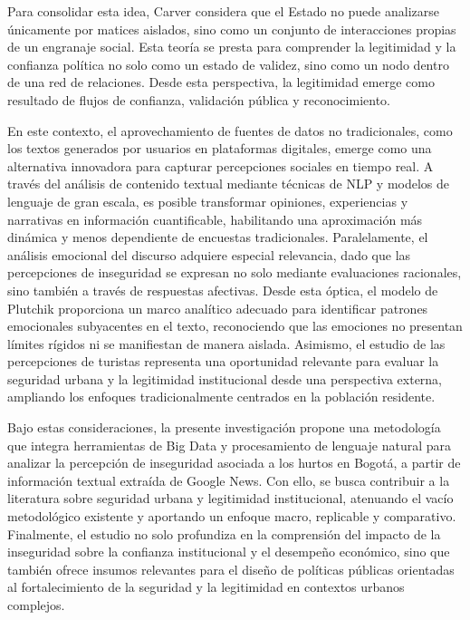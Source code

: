 \documentclass[sn-basic,pdflatex]{sn-jnl}
\theoremstyle{remark}
\theoremstyle{definition}
\begin{document}
Para consolidar esta idea, Carver \citep{carver2009} considera que el
Estado no puede analizarse únicamente por matices aislados, sino como un
conjunto de interacciones propias de un engranaje social. Esta teoría se
presta para comprender la legitimidad y la confianza política no solo
como un estado de validez, sino como un nodo dentro de una red de
relaciones. Desde esta perspectiva, la legitimidad emerge como resultado
de flujos de confianza, validación pública y reconocimiento.

En este contexto, el aprovechamiento de fuentes de datos no
tradicionales, como los textos generados por usuarios en plataformas
digitales, emerge como una alternativa innovadora para capturar
percepciones sociales en tiempo real. A través del análisis de contenido
textual mediante técnicas de NLP y modelos de lenguaje de gran escala,
es posible transformar opiniones, experiencias y narrativas en
información cuantificable, habilitando una aproximación más dinámica y
menos dependiente de encuestas tradicionales. Paralelamente, el análisis
emocional del discurso adquiere especial relevancia, dado que las
percepciones de inseguridad se expresan no solo mediante evaluaciones
racionales, sino también a través de respuestas afectivas. Desde esta
óptica, el modelo de Plutchik \citep{plutchik2003} proporciona un marco
analítico adecuado para identificar patrones emocionales subyacentes en
el texto, reconociendo que las emociones no presentan límites rígidos ni
se manifiestan de manera aislada. Asimismo, el estudio de las
percepciones de turistas representa una oportunidad relevante para
evaluar la seguridad urbana y la legitimidad institucional desde una
perspectiva externa, ampliando los enfoques tradicionalmente centrados
en la población residente.

Bajo estas consideraciones, la presente investigación propone una
metodología que integra herramientas de Big Data y procesamiento de
lenguaje natural para analizar la percepción de inseguridad asociada a
los hurtos en Bogotá, a partir de información textual extraída de Google
News. Con ello, se busca contribuir a la literatura sobre seguridad
urbana y legitimidad institucional, atenuando el vacío metodológico
existente y aportando un enfoque macro, replicable y comparativo.
Finalmente, el estudio no solo profundiza en la comprensión del impacto
de la inseguridad sobre la confianza institucional y el desempeño
económico, sino que también ofrece insumos relevantes para el diseño de
políticas públicas orientadas al fortalecimiento de la seguridad y la
legitimidad en contextos urbanos complejos.
\end{document}
